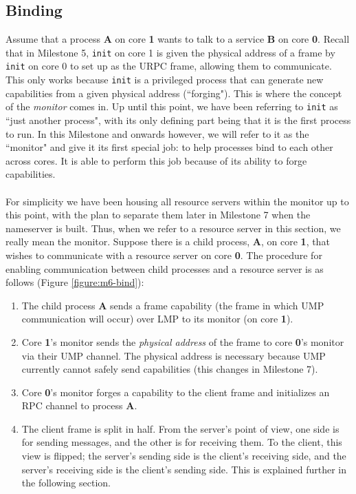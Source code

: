 \subsection{Binding}
Assume that a process \textbf{A} on core \textbf{1} wants to talk to a service \textbf{B} on core \textbf{0}. Recall that in Milestone 5, \texttt{init} on core 1 is given the physical address of a frame by \texttt{init} on core 0 to set up as the URPC frame, allowing them to communicate. This only works because \texttt{init} is a privileged process that can generate new capabilities from a given physical address (``forging"). This is where the concept of the \textit{monitor} comes in. Up until this point, we have been referring to \texttt{init} as ``just another process", with its only defining part being that it is the first process to run. In this Milestone and onwards however, we will refer to it as the ``monitor" and give it its first special job: to help processes bind to each other across cores. It is able to perform this job because of its ability to forge capabilities.
\\\\
For simplicity we have been housing all resource servers within the monitor up to this point, with the plan to separate them later in Milestone 7 when the nameserver is built. Thus, when we refer to a resource server in this section, we really mean the monitor. Suppose there is a child process, \textbf{A}, on core \textbf{1}, that wishes to communicate with a resource server on core \textbf{0}. The procedure for enabling communication between child processes and a resource server is as follows (Figure \ref{figure:m6-bind}):
\begin{enumerate}[itemsep=0pt]
    \item The child process \textbf{A} sends a frame capability (the frame in which UMP communication will occur) over LMP to its monitor (on core \textbf{1}).
    \item Core \textbf{1}'s monitor sends the \textit{physical address} of the frame to core \textbf{0}'s monitor via their UMP channel. The physical address is necessary because UMP currently cannot safely send capabilities (this changes in Milestone 7).
    \item Core \textbf{0}'s monitor forges a capability to the client frame and initializes an RPC channel to process \textbf{A}. 
    \item The client frame is split in half. From the server's point of view, one side is for sending messages, and the other is for receiving them. To the client, this view is flipped; the server's sending side is the client's receiving side, and the server's receiving side is the client's sending side. This is explained further in the following section.
\end{enumerate} 
